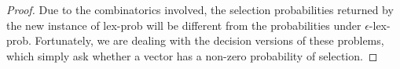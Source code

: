 \documentclass[sigconf]{acmart}
\begin{document}
\begin{proof}




Due to the combinatorics involved, the selection probabilities returned by the new instance of {\sc lex-prob} will be different from the probabilities under {\sc $\epsilon$-lex-prob}. Fortunately, we are dealing with the decision versions of these problems, which simply ask whether a vector has a non-zero probability of selection.

\end{proof}
\end{document}

